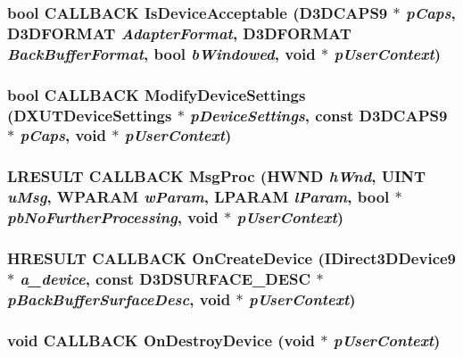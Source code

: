 \subsubsection[{IsDeviceAcceptable}]{\setlength{\rightskip}{0pt plus 5cm}bool CALLBACK IsDeviceAcceptable (D3DCAPS9 $\ast$ {\em pCaps}, \/  D3DFORMAT {\em AdapterFormat}, \/  D3DFORMAT {\em BackBufferFormat}, \/  bool {\em bWindowed}, \/  void $\ast$ {\em pUserContext})}\label{main_8cpp_ab94c0180382a23f0fef5bf9e3986f9da}
\subsubsection[{ModifyDeviceSettings}]{\setlength{\rightskip}{0pt plus 5cm}bool CALLBACK ModifyDeviceSettings (DXUTDeviceSettings $\ast$ {\em pDeviceSettings}, \/  const D3DCAPS9 $\ast$ {\em pCaps}, \/  void $\ast$ {\em pUserContext})}\label{main_8cpp_a001a56eaee98f8077852e3dd8ad60f29}
\subsubsection[{MsgProc}]{\setlength{\rightskip}{0pt plus 5cm}LRESULT CALLBACK MsgProc (HWND {\em hWnd}, \/  UINT {\em uMsg}, \/  WPARAM {\em wParam}, \/  LPARAM {\em lParam}, \/  bool $\ast$ {\em pbNoFurtherProcessing}, \/  void $\ast$ {\em pUserContext})}\label{main_8cpp_ada41d7c415ad7ca4b598647357eabd63}
\subsubsection[{OnCreateDevice}]{\setlength{\rightskip}{0pt plus 5cm}HRESULT CALLBACK OnCreateDevice (IDirect3DDevice9 $\ast$ {\em a\_\-device}, \/  const D3DSURFACE\_\-DESC $\ast$ {\em pBackBufferSurfaceDesc}, \/  void $\ast$ {\em pUserContext})}\label{main_8cpp_a47d46e0ebe0a234c2c6a58c8ca392d74}
\subsubsection[{OnDestroyDevice}]{\setlength{\rightskip}{0pt plus 5cm}void CALLBACK OnDestroyDevice (void $\ast$ {\em pUserContext})}\label{main_8cpp_a6e3dced16e54efc8daddad409cff0336}
